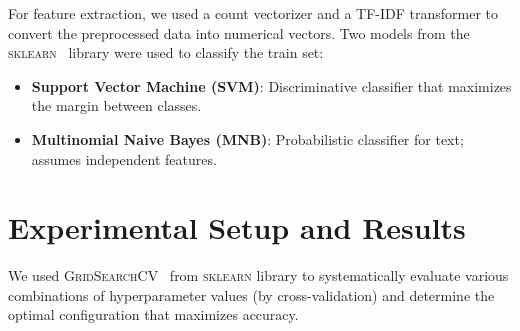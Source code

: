 \documentclass[3pt, sigconf, nonacm]{acmart}
\begin{document}
For feature extraction, we used a count vectorizer and a TF-IDF transformer to convert the preprocessed data into numerical vectors.
Two models from the \textsc{sklearn}~\cite{scikit-learn} library were used to classify the train set:

\begin{itemize}
    \item \textbf{Support Vector Machine (SVM)}: Discriminative classifier that maximizes the margin between classes.
    \item \textbf{Multinomial Naive Bayes (MNB)}: Probabilistic classifier for text; assumes independent features.
\end{itemize}


\section{Experimental Setup and Results}

We used \textsc{GridSearchCV}~\cite{lavalle2004relationship} from \textsc{sklearn} library to systematically evaluate various combinations of hyperparameter values (by cross-validation) and determine the optimal configuration that maximizes accuracy.
\end{document}
